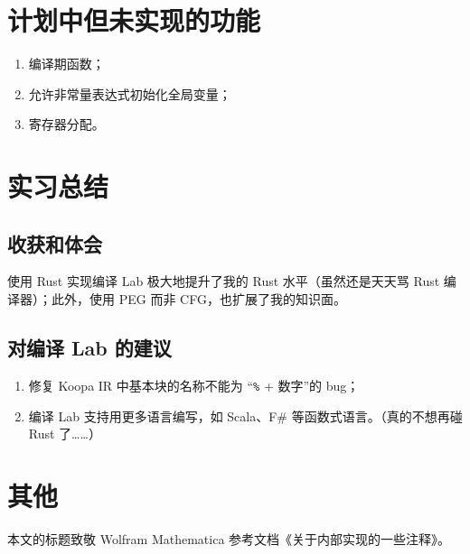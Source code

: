 \section{计划中但未实现的功能}
\begin{enumerate}
    \item 编译期函数；
    \item 允许非常量表达式初始化全局变量；
    \item 寄存器分配。
\end{enumerate}
\section{实习总结}
\subsection{收获和体会}
使用 Rust 实现编译 Lab 极大地提升了我的 Rust 水平（虽然还是天天骂 Rust 编译器）；此外，使用 PEG 而非 CFG，也扩展了我的知识面。
\subsection{对编译 Lab 的建议}
\begin{enumerate}
    \item 修复 Koopa IR 中基本块的名称不能为 “\texttt{\%} + 数字”的 bug；
    \item 编译 Lab 支持用更多语言编写，如 Scala、F\# 等函数式语言。（真的不想再碰 Rust 了……）
\end{enumerate}
\section{其他}
本文的标题致敬 Wolfram Mathematica 参考文档《关于内部实现的一些注释》。

